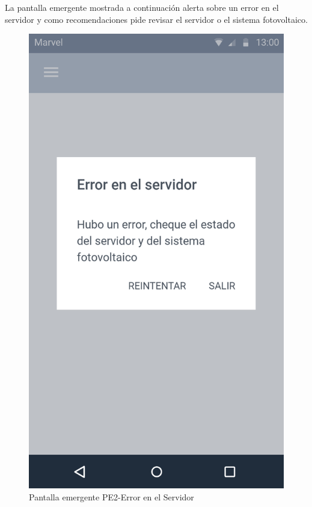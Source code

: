 La pantalla emergente mostrada a continuación alerta sobre un error en el servidor y como recomendaciones pide revisar el servidor o el sistema fotovoltaico.

\begin{figure}[H]
	\centering
	\includegraphics[scale=0.70]{Capitulo4/software/submodulos/images/error_server.png}
	\caption{Pantalla emergente PE2-Error en el Servidor}
	\label{fig:Error en el Servidor}
\end{figure}

